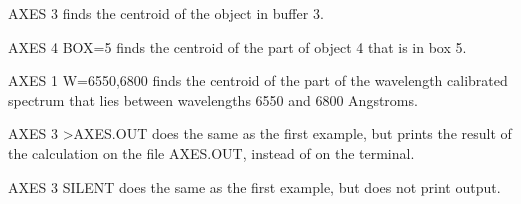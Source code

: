 {\newpage\clearpage
{}%
\begin{example}
  \item[AXES 3\hfill]{finds the centroid of the object in buffer 3.}
  \item[AXES 4 BOX=5\hfill]{finds the centroid of the part of
       object 4 that is in box 5.}
  \item[AXES 1 W=6550,6800\hfill]{finds the centroid of the part of
       the wavelength calibrated spectrum that lies between wavelengths 6550
       and 6800 Angstroms.}
  \item[AXES 3 >AXES.OUT\hfill]{does the same as the first example,
       but prints the result of the calculation on the file AXES.OUT, 
       instead of on the terminal.}
  \item[AXES 3 SILENT\hfill]{does the same as the first example,
       but does not print output.}
\end{example}%
\lthtmlfigureZ
\lthtmlcheckvsize\clearpage}

